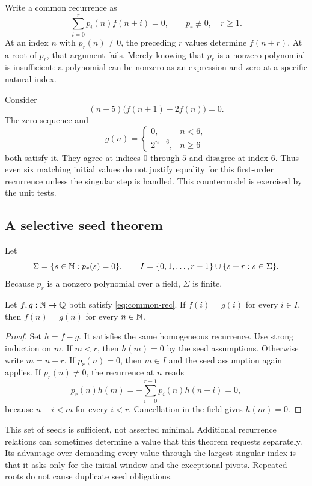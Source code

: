 Write a common recurrence as
\begin{equation}\label{eq:common-rec}
\sum_{i=0}^{r}p_i(n)f(n+i)=0,\qquad p_r\not\equiv0,\quad r\ge1.
\end{equation}
At an index $n$ with $p_r(n)\ne0$, the preceding $r$ values determine $f(n+r)$.
At a root of $p_r$, that argument fails. Merely knowing that $p_r$ is a nonzero
polynomial is insufficient: a polynomial can be nonzero as an expression and
zero at a specific natural index.

\begin{example}
Consider
\[
(n-5)\bigl(f(n+1)-2f(n)\bigr)=0.
\]
The zero sequence and
\[
g(n)=\begin{cases}0,&n<6,\\2^{n-6},&n\ge6\end{cases}
\]
both satisfy it. They agree at indices $0$ through $5$ and disagree at index $6$.
Thus even six matching initial values do not justify equality for this
first-order recurrence unless the singular step is handled. This countermodel
is exercised by the unit tests.
\end{example}

\subsection{A selective seed theorem}

Let
\[
\Sigma=\{s\in\mathbb N:p_r(s)=0\},\qquad
I=\{0,1,\ldots,r-1\}\cup\{s+r:s\in\Sigma\}.
\]
Because $p_r$ is a nonzero polynomial over a field, $\Sigma$ is finite.

\begin{theorem}\label{thm:seeds}
Let $f,g:\mathbb N\to\mathbb Q$ both satisfy \eqref{eq:common-rec}. If $f(i)=g(i)$ for every
$i\in I$, then $f(n)=g(n)$ for every $n\in\mathbb N$.
\end{theorem}
\begin{proof}
Set $h=f-g$. It satisfies the same homogeneous recurrence. Use strong induction
on $m$. If $m<r$, then $h(m)=0$ by the seed assumptions. Otherwise write
$m=n+r$. If $p_r(n)=0$, then $m\in I$ and the seed assumption again applies.
If $p_r(n)\ne0$, the recurrence at $n$ reads
\[
p_r(n)h(m)=-\sum_{i=0}^{r-1}p_i(n)h(n+i)=0,
\]
because $n+i<m$ for every $i<r$. Cancellation in the field gives $h(m)=0$.
\end{proof}

This set of seeds is sufficient, not asserted minimal. Additional recurrence
relations can sometimes determine a value that this theorem requests
separately. Its advantage over demanding every value through the largest
singular index is that it asks only for the initial window and the exceptional
pivots. Repeated roots do not cause duplicate seed obligations.

